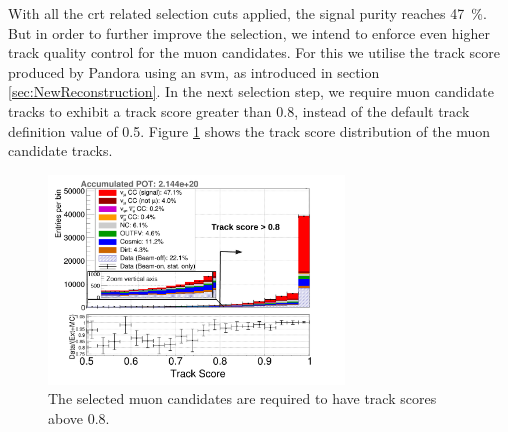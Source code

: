 With all the \gls{crt} related selection cuts applied, the signal purity reaches \SI{47}{\percent}. But in order to further improve the selection, we intend to enforce even higher track quality control for the muon candidates. For this we utilise the track score produced by \gls{Pandora} using an \gls{svm}, as introduced in section \ref{sec:NewReconstruction}. In the next selection step, we require muon candidate tracks to exhibit a track score greater than \num{0.8}, instead of the default track definition value of \num{0.5}. Figure \ref{fig:trackscore_08_5} shows the track score distribution of the muon candidate tracks.
\begin{figure}[htbp]
  \centering
  \includegraphics[width=0.7\textwidth]{images/NewCCInclusive/selection/Trackscore_08_5.pdf}
  \caption[Muon Candidate Track Score Cut]{The selected muon candidates are required to have track scores above 0.8.}
  \label{fig:trackscore_08_5}
\end{figure}

